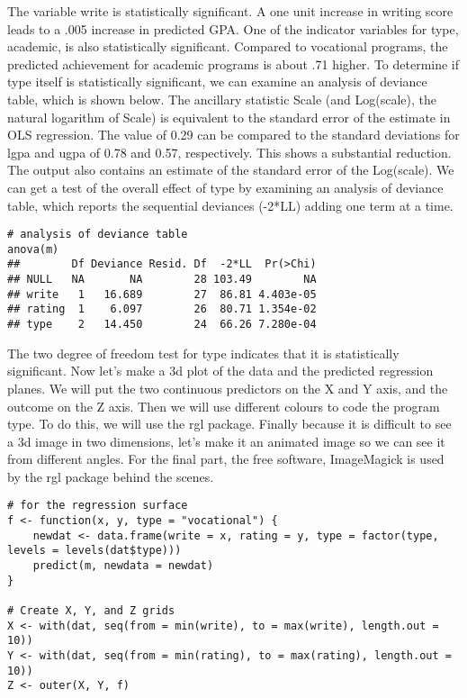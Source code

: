 \documentclass[a4paper,12pt]{article}
\begin{document}
The variable write is statistically significant. A one unit increase in writing score leads to a .005 increase in predicted GPA. One of the indicator variables for type, academic, is also statistically significant. Compared to vocational programs, the predicted achievement for academic programs is about .71 higher. To determine if type itself is statistically significant, we can examine an analysis of deviance table, which is shown below.
The ancillary statistic Scale (and Log(scale), the natural logarithm of Scale) is equivalent to the standard error of the estimate in OLS regression. The value of 0.29 can be compared to the standard deviations for lgpa and ugpa of 0.78 and 0.57, respectively. This shows a substantial reduction. The output also contains an estimate of the standard error of the Log(scale).
We can get a test of the overall effect of type by examining an analysis of deviance table, which reports the sequential deviances (-2*LL) adding one term at a time.
\begin{framed}
\begin{verbatim}
# analysis of deviance table
anova(m)
##        Df Deviance Resid. Df  -2*LL  Pr(>Chi)
## NULL   NA       NA        28 103.49        NA
## write   1   16.689        27  86.81 4.403e-05
## rating  1    6.097        26  80.71 1.354e-02
## type    2   14.450        24  66.26 7.280e-04
\end{verbatim}
\end{framed}
The two degree of freedom test for type indicates that it is statistically significant.
Now let's make a 3d plot of the data and the predicted regression planes. We will put the two continuous predictors on the X and Y axis, and the outcome on the Z axis. Then we will use different colours to code the program type. To do this, we will use the rgl package. Finally because it is difficult to see a 3d image in two dimensions, let's make it an animated image so we can see it from different angles. For the final part, the free software, ImageMagick is used by the rgl package behind the scenes.
\begin{framed}
\begin{verbatim}
# for the regression surface
f <- function(x, y, type = "vocational") {
    newdat <- data.frame(write = x, rating = y, type = factor(type, levels = levels(dat$type)))
    predict(m, newdata = newdat)
}

# Create X, Y, and Z grids
X <- with(dat, seq(from = min(write), to = max(write), length.out = 10))
Y <- with(dat, seq(from = min(rating), to = max(rating), length.out = 10))
Z <- outer(X, Y, f)
\end{verbatim}
\end{framed}
\end{document}
